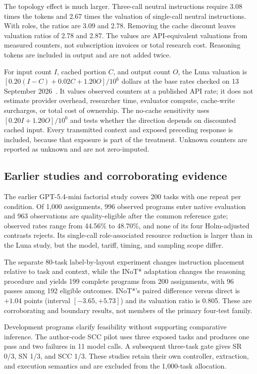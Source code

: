 The topology effect is much larger. Three-call neutral instructions require 3.08 times the tokens and 2.67 times the valuation of single-call neutral instructions. With roles, the ratios are 3.09 and 2.78. Removing the cache discount leaves valuation ratios of 2.78 and 2.87. The values are API-equivalent valuations from measured counters, not subscription invoices or total research cost. Reasoning tokens are included in output and are not added twice.

For input count $I$, cached portion $C$, and output count $O$, the Luna valuation is $[0.20(I-C)+0.02C+1.20O]/10^6$ dollars at the base rates checked on 13 September 2026~\cite{openai56luna2026}. It values observed counters at a published API rate; it does not estimate provider overhead, researcher time, evaluator compute, cache-write surcharges, or total cost of ownership. The no-cache sensitivity uses $[0.20I+1.20O]/10^6$ and tests whether the direction depends on discounted cached input. Every transmitted context and exposed preceding response is included, because that exposure is part of the treatment. Unknown counters are reported as unknown and are not zero-imputed.




\subsection{Earlier studies and corroborating evidence}
The earlier GPT-5.4-mini factorial study covers 200 tasks with one repeat per condition. Of 1,000 assignments, 996 observed programs enter native evaluation and 963 observations are quality-eligible after the common reference gate; observed rates range from 44.56\% to 48.70\%, and none of its four Holm-adjusted contrasts rejects. Its single-call role-associated resource reduction is larger than in the Luna study, but the model, tariff, timing, and sampling scope differ.

The separate 80-task label-by-layout experiment changes instruction placement relative to task and context, while the INoT* adaptation changes the reasoning procedure and yields 199 complete programs from 200 assignments, with 96 passes among 192 eligible outcomes. INoT*'s paired difference versus direct is $+1.04$ points (interval $[-3.65,+5.73]$) and its valuation ratio is 0.805. These are corroborating and boundary results, not members of the primary four-test family.

Development programs clarify feasibility without supporting comparative inference. The author-code SCC pilot uses three exposed tasks and produces one pass and two failures in 11 model calls. A subsequent three-task gate gives SR 0/3, SN 1/3, and SCC 1/3. These studies retain their own controller, extraction, and execution semantics and are excluded from the 1,000-task allocation.

